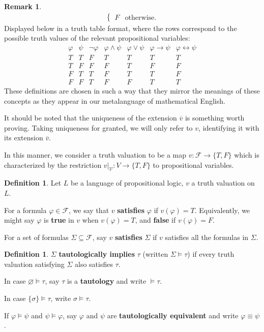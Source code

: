 \documentclass[12pt]{article}
\theoremstyle{definition}
\newtheorem{definition}[theorem]{Definition}
\newtheorem{remark}[theorem]{Remark}
\renewcommand{\phi}{\varphi}
\renewcommand{\emptyset}{\varnothing}
\newcommand{\<}{\langle}
\renewcommand{\>}{\rangle}
\newcommand{\clo}{\overline}
\newcommand{\seq}{\subseteq}
\newcommand{\FF}{\mathcal{F}}
\newcommand{\VV}{\mathcal{V}}
\newcommand{\keyword}{\textbf}
\newcommand{\liff}{\leftrightarrow}
\begin{document}
\begin{remark}
\begin{align*}
\begin{cases}
            F & \text{otherwise}.
        \end{cases}
    \end{align*}
        Displayed below in a truth table format, where the rows correspond to the possible truth values of the relevant propositional variables:
    \[
        \begin{array}{cc|c|c|c|c|c}
            \phi & \psi & \lnot\phi & \phi\land\psi & \phi\lor\psi & \phi\to\psi & \phi\liff\psi \\
            \hline
            T & T & F & T & T & T & T \\
            T & F & F & F & T & F & F \\
            F & T & T & F & T & T & F \\
            F & F & T & F & F & T & T
        \end{array}
    \]
    These definitions are chosen in such a way that they mirror the meanings of these concepts as they appear in our metalanguage of mathematical English.

    It should be noted that the uniqueness of the extension $\clo{v}$ is something worth proving.
    Taking uniqueness for granted, we will only refer to $v$, identifying it with its extension $\clo{v}$.

    In this manner, we consider a truth valuation to be a map $v : \FF \to \{T, F\}$ which is characterized by the restriction $v|_\VV : V \to \{T, F\}$ to propositional variables.
\end{remark}

\begin{definition}
    Let $L$ be a language of propositional logic, $v$ a truth valuation on $L$.
    
    For a formula $\phi \in \FF$, we say that $v$ \keyword{satisfies} $\phi$ if $v(\phi) = T$.
    Equivalently, we might say $\phi$ is \keyword{true} in $v$ when $v(\phi) = T$, and \keyword{false} if $v(\phi) = F$.

    For a set of formulas $\Sigma \seq \FF$, say $v$ \keyword{satisfies} $\Sigma$ if $v$ satisfies all the formulas in $\Sigma$.
\end{definition}

\begin{definition}
    $\Sigma$ \keyword{tautologically implies} $\tau$ (written $\Sigma \vDash \tau$) if every truth valuation satisfying $\Sigma$ also satisfies $\tau$.

    In case $\emptyset \vDash \tau$, say $\tau$ is a \keyword{tautology} and write $\vDash \tau$.

    In case $\{\sigma\} \vDash \tau$, write $\sigma \vDash \tau$.

    If $\phi \vDash \psi$ and $\psi \vDash \phi$, say $\phi$ and $\psi$ are \keyword{tautologically equivalent} and write $\phi \equiv \psi$.
\end{definition}
\end{document}
